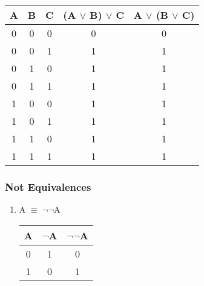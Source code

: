 \documentclass[12pt]{article}
\begin{document}
\begin{enumerate}
\begin{center}

  \begin{tabular}{| c | c | c | c | c |}

    \hline

    A & B & C & (A $\lor$ B) $\lor$ C & A $\lor$ (B $\lor$ C) \\ \hline

    0 & 0 & 0 & 0 & 0 \\

    0 & 0 & 1 & 1 & 1 \\

    0 & 1 & 0 & 1 & 1 \\

    0 & 1 & 1 & 1 & 1 \\

    1 & 0 & 0 & 1 & 1 \\

    1 & 0 & 1 & 1 & 1 \\

    1 & 1 & 0 & 1 & 1 \\

    1 & 1 & 1 & 1 & 1 \\ \hline

  \end{tabular}

\end{center}

\end{enumerate}



\subsubsection{Not Equivalences}

\begin{enumerate}



  \item A $\equiv$ $\neg$$\neg$A



\begin{center}

  \begin{tabular}{| c | c | c |}

    \hline

    A & $\neg$A & $\neg$$\neg$A \\ \hline

    0 & 1 & 0 \\

    1 & 0 & 1 \\ \hline

  \end{tabular}

\end{center}



\end{enumerate}
\end{document}

